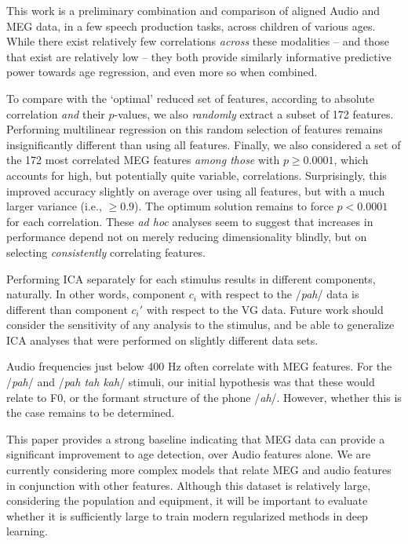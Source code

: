 \documentclass[utf8]{frontiersSCNS} %
\begin{document}

This work is a preliminary combination and comparison of aligned Audio and MEG data, in a few speech production tasks, across children of various ages. While there exist relatively few correlations {\em across} these modalities -- and those that exist are relatively low -- they both provide similarly informative predictive power towards age regression, and even more so when combined.

To compare with the `optimal' reduced set of features, according to absolute correlation {\em and} their $p$-values, we also {\em randomly} extract a subset of 172 features. Performing multilinear regression on this random selection of features remains insignificantly different than using all features. Finally, we also considered a set of the 172 most correlated MEG features {\em among those} with $p \geq 0.0001$, which accounts for high, but potentially quite variable, correlations. Surprisingly, this improved accuracy slightly on average over using all features, but with a much larger variance (i.e., $\geq 0.9$). The optimum solution remains to force $p<0.0001$ for each correlation. These {\em ad hoc} analyses seem to suggest that increases in performance depend not on merely reducing dimensionality blindly, but on selecting {\em consistently} correlating features.

Performing ICA separately for each stimulus results in different components, naturally. In other words, component $c_i$ with respect to the /{\em pah}/ data is different than component $c_i'$ with respect to the VG data. Future work should consider the sensitivity of any analysis to the stimulus, and be able to generalize ICA analyses that were performed on slightly different data sets.

Audio frequencies just below 400 Hz often correlate with MEG features. For the /{\em pah}/ and /{\em pah tah kah}/ stimuli, our initial hypothesis was that these would relate to F0, or the formant structure of the phone /{\em ah}/. However, whether this is the case remains to be determined.

This paper provides a strong baseline indicating that MEG data can provide a significant improvement to age detection, over Audio features alone. We are currently considering more complex models that relate MEG and audio features in conjunction with other features. Although this dataset is relatively large, considering the population and equipment, it will be important to evaluate whether it is sufficiently large to train modern regularized methods in deep learning.
\end{document}
